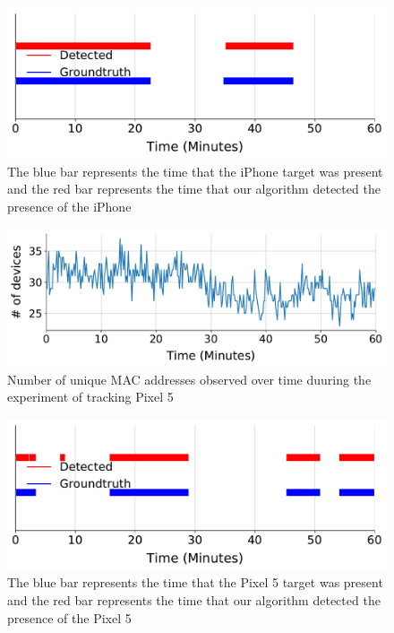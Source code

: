 \begin{figure}[t!]
    \centering
    \includegraphics[width = \linewidth]{plots/case_study_iphone.pdf} 
    \caption{The blue bar represents the time that the iPhone target was present and the red bar represents the time that our algorithm detected the presence of the iPhone}
    \label{fig:iphone}
\end{figure}


\begin{figure}[t!]
    \centering
    \includegraphics[width = \linewidth]{plots/case_study_android_devno.pdf} 
    \caption{Number of unique MAC addresses observed over time duuring the experiment of tracking Pixel 5}
    \label{fig:android_no}
\end{figure}

\begin{figure}[t!]
    \centering
    \includegraphics[width = \linewidth]{plots/case_study_android.pdf} 
    \caption{The blue bar represents the time that the Pixel 5 target was present and the red bar represents the time that our algorithm detected the presence of the Pixel 5}
    \label{fig:android}
\end{figure}

